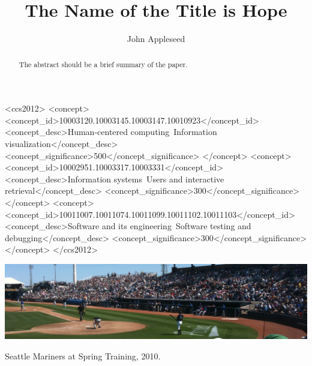 \documentclass[sigconf,review,anonymous]{_acm/acmart}
\begin{document}
\title{The Name of the Title is Hope}

\author{John Appleseed}

\renewcommand{\shortauthors}{Appleseed, et al.}

\begin{abstract}
  The abstract should be a brief summary of the paper.
\end{abstract}

\begin{CCSXML}
<ccs2012>
  <concept>
    <concept_id>10003120.10003145.10003147.10010923</concept_id>
    <concept_desc>Human-centered computing~Information visualization</concept_desc>
    <concept_significance>500</concept_significance>
  </concept>
  <concept>
    <concept_id>10002951.10003317.10003331</concept_id>
    <concept_desc>Information systems~Users and interactive retrieval</concept_desc>
    <concept_significance>300</concept_significance>
    </concept>
  <concept>
    <concept_id>10011007.10011074.10011099.10011102.10011103</concept_id>
    <concept_desc>Software and its engineering~Software testing and debugging</concept_desc>
    <concept_significance>300</concept_significance>
  </concept>
</ccs2012>
\end{CCSXML}




\begin{teaserfigure}
  \includegraphics[width=\textwidth]{figures/sampleteaser}
  \caption{Seattle Mariners at Spring Training, 2010.}
  \label{fig:teaser}
\end{teaserfigure}
\end{document}
